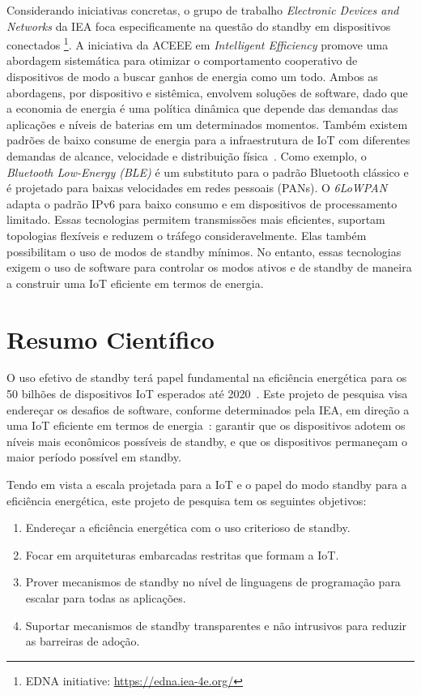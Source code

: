 \documentclass[12pt,english]{amsart}
\begin{document}
Considerando iniciativas concretas, o grupo de trabalho
\emph{Electronic Devices and Networks} da IEA foca especificamente na questão
do standby em dispositivos conectados%
\footnote{EDNA initiative: \url{https://edna.iea-4e.org/}}.
A iniciativa da ACEEE em \emph{Intelligent Efficiency} promove uma abordagem
sistemática para otimizar o comportamento cooperativo de dispositivos de modo
a buscar ganhos de energia como um todo.
Ambos as abordagens, por dispositivo e sistêmica, envolvem soluções de
software, dado que a economia de energia é uma política dinâmica que depende
das demandas das aplicações e níveis de baterias em um determinados momentos.
%
Também existem padrões de baixo consume de energia para a infraestrutura de IoT
com diferentes demandas de alcance, velocidade e distribuição
física~\cite{iot.energy.2}.
Como exemplo, o \emph{Bluetooth Low-Energy (BLE)} é um substituto para o padrão
Bluetooth clássico e é projetado para baixas velocidades em redes pessoais
(PANs).
O \emph{6LoWPAN} adapta o padrão IPv6 para baixo consumo e em dispositivos de
processamento limitado.
%
Essas tecnologias permitem transmissões mais eficientes, suportam topologias
flexíveis e reduzem o tráfego consideravelmente.
Elas também possibilitam o uso de modos de standby mínimos.
%
No entanto, essas tecnologias exigem o uso de software para controlar os modos
ativos e de standby de maneira a construir uma IoT eficiente em termos de
energia.

\section{Resumo Científico}

O uso efetivo de standby terá papel fundamental na eficiência energética para
os 50 bilhões de dispositivos IoT esperados até 2020~\cite{iea.data}.
%
Este projeto de pesquisa visa endereçar os desafios de software, conforme
determinados pela IEA, em direção a uma IoT eficiente em termos de
energia~\cite{iea.data}:
    garantir que os dispositivos adotem os níveis mais econômicos possíveis de
    standby, e que os dispositivos permaneçam o maior período possível em
    standby.

Tendo em vista a escala projetada para a IoT e o papel do modo standby para a
eficiência energética, este projeto de pesquisa tem os seguintes objetivos:

\begin{enumerate}
    \item Endereçar a eficiência energética com o uso criterioso de standby.
    \item Focar em arquiteturas embarcadas restritas que formam a IoT.
    \item Prover mecanismos de standby no nível de linguagens de programação para
          escalar para todas as aplicações.
    \item Suportar mecanismos de standby transparentes e não intrusivos para
          reduzir as barreiras de adoção.
\end{enumerate}
\end{document}
